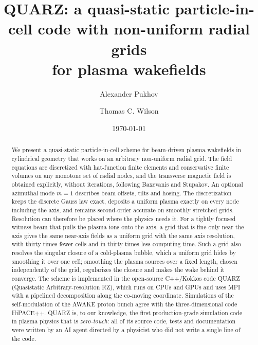 \documentclass[aps,prab,reprint,floatfix,superscriptaddress,amsmath,amssymb]{revtex4-2}
\begin{document}
\title{QUARZ: a quasi-static particle-in-cell code with non-uniform radial grids\\ for plasma wakefields}

\author{Alexander Pukhov}
\author{Thomas C. Wilson}

\date{\today}

\begin{abstract}
We present a quasi-static particle-in-cell scheme for beam-driven plasma wakefields in cylindrical geometry that works on an arbitrary non-uniform radial grid. The field equations are discretized with hat-function finite elements and conservative finite volumes on any monotone set of radial nodes, and the transverse magnetic field is obtained explicitly, without iterations, following Baxevanis and Stupakov. An optional azimuthal mode $m=1$ describes beam offsets, tilts and hosing. The discretization keeps the discrete Gauss law exact, deposits a uniform plasma exactly on every node including the axis, and remains second-order accurate on smoothly stretched grids. Resolution can therefore be placed where the physics needs it. For a tightly focused witness beam that pulls the plasma ions onto the axis, a grid that is fine only near the axis gives the same near-axis fields as a uniform grid with the same axis resolution, with thirty times fewer cells and in thirty times less computing time. Such a grid also resolves the singular closure of a cold-plasma bubble, which a uniform grid hides by smoothing it over one cell; smoothing the plasma sources over a fixed length, chosen independently of the grid, regularizes the closure and makes the wake behind it converge. The scheme is implemented in the open-source C++/Kokkos code QUARZ (Quasistatic Arbitrary-resolution RZ), which runs on CPUs and GPUs and uses MPI with a pipelined decomposition along the co-moving coordinate. Simulations of the self-modulation of the AWAKE proton bunch agree with the three-dimensional code HiPACE++. QUARZ is, to our knowledge, the first production-grade simulation code in plasma physics that is \emph{zero-touch}: all of its source code, tests and documentation were written by an AI agent directed by a physicist who did not write a single line of the code.
\end{abstract}

\maketitle
\end{document}
